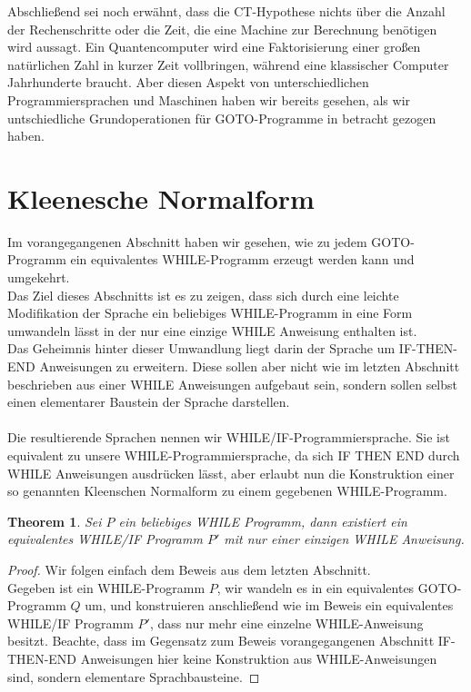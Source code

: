 \documentclass[11pt,a4paper,leqno]{report}
\newtheorem{theorem}{Theorem}[chapter]
\numberwithin{equation}{chapter}
\begin{document}
Abschlie\ss{}end sei noch erw\"ahnt, dass die CT-Hypothese nichts \"uber die Anzahl der Rechenschritte oder die Zeit, die eine Machine zur Berechnung ben\"otigen wird aussagt. Ein Quantencomputer wird eine Faktorisierung einer gro\ss{}en nat\"urlichen Zahl in kurzer Zeit vollbringen, w\"ahrend eine klassischer Computer Jahrhunderte braucht. Aber diesen Aspekt von unterschiedlichen Programmiersprachen und Maschinen haben wir bereits gesehen, als wir untschiedliche Grundoperationen f\"ur GOTO-Programme in betracht gezogen haben.

\section{Kleenesche Normalform}
Im vorangegangenen Abschnitt haben wir gesehen, wie zu jedem GOTO-Programm ein equivalentes WHILE-Programm erzeugt werden kann und umgekehrt.\\
Das Ziel dieses Abschnitts ist es zu zeigen, dass  sich durch eine leichte Modifikation der Sprache ein beliebiges WHILE-Programm in eine Form umwandeln l\"asst in der nur eine einzige WHILE Anweisung enthalten ist.\\
Das Geheimnis hinter dieser Umwandlung liegt darin der Sprache um IF-THEN-END Anweisungen zu erweitern. Diese sollen aber nicht wie im letzten Abschnitt beschrieben aus einer WHILE Anweisungen aufgebaut sein, sondern sollen selbst einen elementarer Baustein der Sprache darstellen.\\
\\
Die resultierende Sprachen nennen wir WHILE/IF-Programmiersprache. Sie ist equivalent zu unsere WHILE-Programmiersprache, da sich IF THEN END durch WHILE Anweisungen ausdr\"ucken l\"asst, aber erlaubt nun die Konstruktion einer so genannten Kleenschen Normalform zu einem gegebenen WHILE-Programm.
\begin{theorem}
	Sei $P$ ein beliebiges WHILE Programm, dann existiert ein equivalentes WHILE/IF Programm $P'$ mit nur einer einzigen WHILE Anweisung.
\end{theorem}
\begin{proof}
Wir folgen einfach dem Beweis aus dem letzten Abschnitt.\\
Gegeben ist ein WHILE-Programm $P$, wir wandeln es in ein equivalentes GOTO-Programm $Q$ um, und konstruieren anschlie\ss{}end wie im Beweis ein equivalentes WHILE/IF Programm $P'$, dass nur mehr eine einzelne WHILE-Anweisung besitzt. Beachte, dass im Gegensatz zum Beweis vorangegangenen Abschnitt IF-THEN-END Anweisungen hier keine Konstruktion aus WHILE-Anweisungen sind, sondern elementare Sprachbausteine.
\end{proof}
\end{document}
